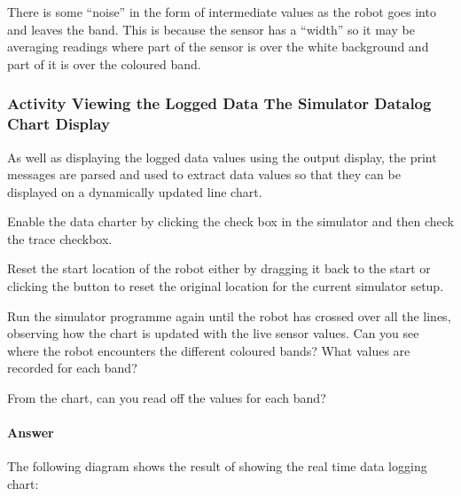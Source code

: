 \documentclass[letterpaper,10pt,english]{sphinxmanual}
\let\sphinxpxdimen\pdfpxdimen\else\newdimen\sphinxpxdimen
\begin{document}
There is some “noise” in the form of intermediate values as the robot goes into and leaves the band. This is because the sensor has a “width” so it may be averaging readings where part of the sensor is over the white background and part of it is over the coloured band.


\subsubsection{Activity \sphinxhyphen{} Viewing the Logged Data \sphinxhyphen{} The Simulator Datalog Chart Display}
\label{\detokenize{content/00_SOFTWARE_GUIDE/Section_00_03_quick_practical_tour:Activity---Viewing-the-Logged-Data---The-Simulator-Datalog-Chart-Display}}
As well as displaying the logged data values using the output display, the print messages are parsed and used to extract data values so that they can be displayed on a dynamically updated line chart.

Enable the data charter by clicking the  check box in the simulator and then check the  trace checkbox.


Reset the start location of the robot either by dragging it back to the start or clicking the  button to reset the original location for the current simulator setup.

Run the simulator programme again until the robot has crossed over all the lines, observing how the chart is updated with the live sensor values. Can you see where the robot encounters the different coloured bands? What values are recorded for each band?

From the chart, can you read off the values for each band?


\paragraph{Answer}
\label{\detokenize{content/00_SOFTWARE_GUIDE/Section_00_03_quick_practical_tour:id1}}

The following diagram shows the result of showing the real time data logging chart:

\sphinxincludegraphics[width=1966\sphinxpxdimen,height=1150\sphinxpxdimen]{{Section_00_03_-_charting}.png}
\end{document}
